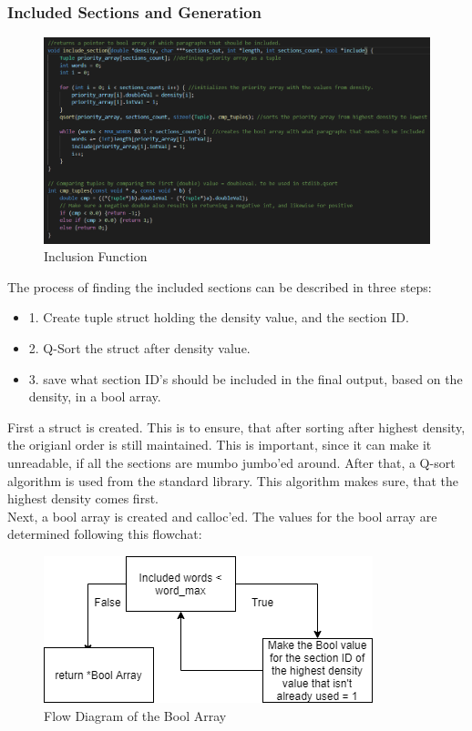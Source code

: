 \subsubsection{Included Sections and Generation}
\begin{figure}[H]
  \centering
  \includegraphics[scale = 0.6]{figures/includefunction.png}
  \caption{Inclusion Function}\label{fig:ie}
\end{figure}
The process of finding the included sections can be described in three steps:
\begin{itemize}
  \item 1. Create tuple struct holding the density value, and the section ID.
  \item 2. Q-Sort the struct after density value.
  \item 3. save what section ID's should be included in the final output, based on the density, in a bool array.
\end{itemize}
First a struct is created. This is to ensure, that after sorting after highest density, the origianl order is still maintained.
This is important, since it can make it unreadable, if all the sections are mumbo jumbo'ed around.
After that, a Q-sort algorithm is used from the standard library. This algorithm makes sure, that the highest density comes first.
\\
Next, a bool array is created and calloc'ed. The values for the bool array are determined following this flowchat:
\begin{figure}[H]
  \centering
  \includegraphics[scale = 0.6]{figures/include_flow.png}
  \caption{Flow Diagram of the Bool Array}\label{fig:ie}
\end{figure} 
